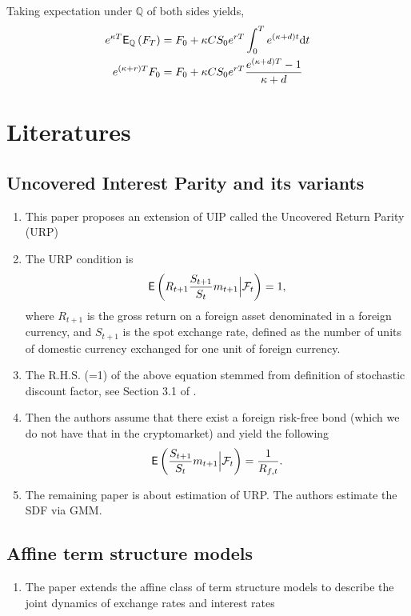 \documentclass[square]{article} %
\theoremstyle{plain}
\theoremstyle{definition} %
\begin{document}
Taking expectation under $\mathbb{Q}$ of both sides yields, 
\begin{align*}
  e^{\kappa T}\mathbb{\sf E}_\mathbb{Q}\left(F_T\right) & = F_0 + \kappa C S_0 e^{rT} \int_0^T e^{(\kappa + d) t}{\rm d} t\\
  e^{(\kappa + r) T}F_0 & = F_0 + \kappa C S_0 e^{rT} \frac{e^{(\kappa + d) T} - 1}{\kappa + d}
\end{align*}

\section{Literatures}
\subsection{Uncovered Interest Parity and its variants}
\cite{cappiello2007uncovered}
\begin{enumerate}
  \item This paper proposes an extension of UIP called the Uncovered Return Parity (URP)
  \item The URP condition is 
  \begin{align*}
    \mathbb{\sf E}\left(R_{t+1}\frac{S_{t+1}}{S_t}m_{t+1}\Big|\mathcal{F}_t\right)=1,
  \end{align*}
  where $R_{t+1}$ is the gross return on a foreign asset denominated in a foreign currency, and $S_{t+1}$ is the spot exchange rate, defined as the number of units of domestic currency exchanged for one unit of foreign currency. 
  \item The R.H.S. (=1) of the above equation stemmed from definition of stochastic discount factor, see Section 3.1 of \cite{back2010asset}. 
  \item Then the authors assume that there exist a foreign risk-free bond (which we do not have that in the cryptomarket) and yield the following
  \begin{align*}
    \mathbb{\sf E}\left(\frac{S_{t+1}}{S_t}m_{t+1}\Big|\mathcal{F}_t\right) = \frac{1}{R_{f,t}}.
  \end{align*}
  \item The remaining paper is about estimation of URP. The authors estimate the SDF via GMM. 
\end{enumerate}

\subsection{Affine term structure models}
\cite{anderson2010affine}
\begin{enumerate}
  \item The paper extends the affine class of term structure models to describe the joint dynamics of exchange rates and interest rates
\end{enumerate}
\end{document}
